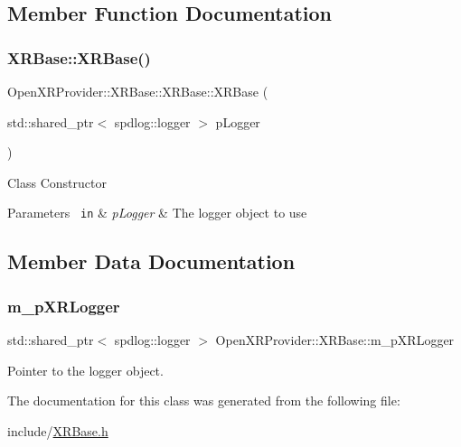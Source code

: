 \subsection{Member Function Documentation}
\mbox{\label{class_open_x_r_provider_1_1_x_r_base_a10b7af39f9c344f6c932d1d0f6364af9}} 
\subsubsection{\texorpdfstring{XRBase::XRBase()}{XRBase::XRBase()}}
{\footnotesize\ttfamily Open\+X\+R\+Provider\+::\+X\+R\+Base\+::\+X\+R\+Base\+::\+X\+R\+Base (\begin{DoxyParamCaption}\item[{std\+::shared\+\_\+ptr$<$ spdlog\+::logger $>$}]{p\+Logger }\end{DoxyParamCaption})\hspace{0.3cm}{\ttfamily [inline]}}

Class Constructor 
\begin{DoxyParams}[1]{Parameters}
\mbox{\texttt{ in}}  & {\em p\+Logger} & The logger object to use \\
\hline
\end{DoxyParams}


\subsection{Member Data Documentation}
\mbox{\label{class_open_x_r_provider_1_1_x_r_base_ad8f2954d8fa4724f1d41076efe392c97}} 
\subsubsection{\texorpdfstring{m\_pXRLogger}{m\_pXRLogger}}
{\footnotesize\ttfamily std\+::shared\+\_\+ptr$<$ spdlog\+::logger $>$ Open\+X\+R\+Provider\+::\+X\+R\+Base\+::m\+\_\+p\+X\+R\+Logger}



Pointer to the logger object. 



The documentation for this class was generated from the following file\+:\begin{DoxyCompactItemize}
\item 
include/\mbox{\hyperlink{_x_r_base_8h}{X\+R\+Base.\+h}}\end{DoxyCompactItemize}
